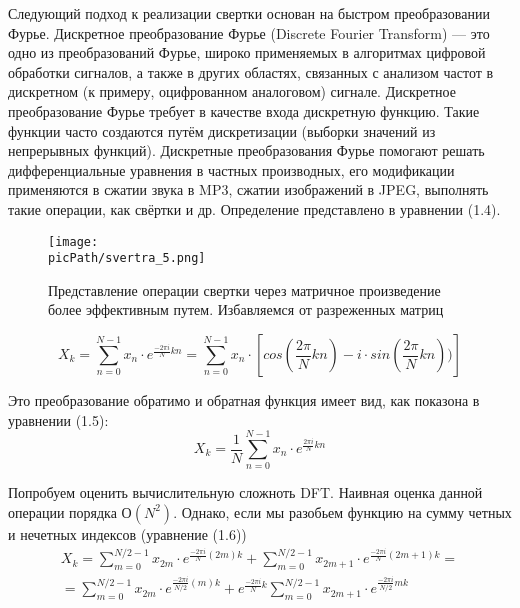 \documentclass[oneside,final,12pt]{extreport}
\newcommand{\picPath}{images}
\begin{document}
Следующий подход к реализации свертки основан на быстром преобразовании Фурье. Дискретное преобразование Фурье (Discrete Fourier Transform) — это одно из преобразований Фурье, широко применяемых в алгоритмах цифровой обработки сигналов, а также в других областях, связанных с анализом частот в дискретном (к примеру, оцифрованном аналоговом) сигнале. Дискретное преобразование Фурье требует в качестве входа дискретную функцию. Такие функции часто создаются путём дискретизации (выборки значений из непрерывных функций). Дискретные преобразования Фурье помогают решать дифференциальные уравнения в частных производных, его модификации применяются в сжатии звука в MP3, сжатии изображений в JPEG, выполнять такие операции, как свёртки и др. Определение представлено в уравнении (1.4).

\begin{figure}[H]
\begin{center}
  \texttt{[image: \\picPath/svertra\_5.png]}
  \caption{Представление операции свертки через матричное произведение более эффективным путем. Избавляемся от разреженных матриц}
  \label{fig:svertra_5}
  \end{center}
\end{figure}


\begin{equation}
X_k = \sum_{n=0}^{N-1}x_n\cdot e^{\frac{-2\pi i}{N}kn}=\sum_{n=0}^{N-1}x_n\cdot[cos(\frac{2\pi}{N}kn)-i\cdot sin(\frac{2\pi}{N}kn))]    
\end{equation}

Это преобразование обратимо и обратная функция имеет вид, как показона в уравнении (1.5):
\begin{equation}
X_k = \frac{1}{N}\sum_{n=0}^{N-1}x_n\cdot e^{\frac{2\pi i}{N}kn}
\end{equation}

Попробуем оценить вычислительную сложноть DFT. 
Наивная оценка данной операции порядка $ О (N^2) $. Однако, если мы разобьем функцию на сумму четных и нечетных индексов (уравнение (1.6))
\begin{equation}
\begin{split}
X_k = \sum_{m=0}^{N/2-1}x_{2m}\cdot e^{\frac{-2\pi i}{N}(2m)k} + \sum_{m=0}^{N/2-1}x_{2m+1}\cdot e^{\frac{-2\pi i}{N}(2m+1)k} = \\ =\sum_{m=0}^{N/2-1}x_{2m}\cdot e^{\frac{-2\pi i}{N/2}(m)k} + e^{\frac{-2\pi i}{N}k}\sum_{m=0}^{N/2-1}x_{2m+1}\cdot e^{\frac{-2\pi i}{N/2}mk}
\end{split}
\end{equation}
\end{document}
